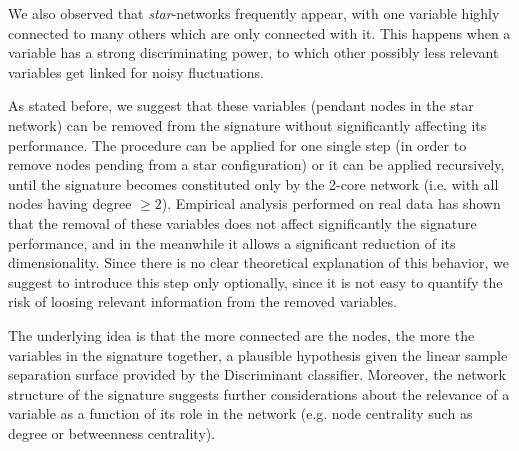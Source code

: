 \documentclass{standalone}
\begin{document}
We also observed that \emph{star}-networks frequently appear, with one variable highly connected to many others which are only connected with it.
This happens when a variable has a strong discriminating power, to which other possibly less relevant variables get linked for noisy fluctuations.

As stated before, we suggest that these variables (pendant nodes in the star network) can be removed from the signature without significantly affecting its performance.
The procedure can be applied for one single step (in order to remove nodes pending from a star configuration) or it can be applied recursively, until the signature becomes constituted only by the 2-core network (i.e. with all nodes having degree $\geq2$).
Empirical analysis performed on real data has shown that the removal of these variables does not affect significantly the signature performance, and in the meanwhile it allows a significant reduction of its dimensionality.
Since there is no clear theoretical explanation of this behavior, we suggest to introduce this step only optionally, since it is not easy to quantify the risk of loosing relevant information from the removed variables.

The underlying idea is that the more connected are the nodes, the more the variables in the signature  together, a plausible hypothesis given the linear sample separation surface provided by the Discriminant classifier.
Moreover, the network structure of the signature suggests further considerations about the relevance of a variable as a function of its role in the network (e.g. node centrality such as degree or betweenness centrality).
\end{document}
